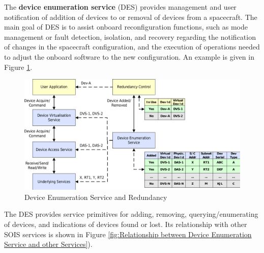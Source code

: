 The \textbf{device enumeration service} (DES) provides management and user notification of addition of devices to or removal of devices from a spacecraft. The main goal of DES is to assist onboard reconfiguration functions, such as mode management or fault detection, isolation, and recovery regarding the notification of changes in the spacecraft configuration, and the execution of operations needed to adjust the onboard software to the new configuration. An example is given in Figure \ref{fig:Device Enumeration Service and Redundancy}.

\begin{figure}[h]
\centering\includegraphics[scale=0.3]{fig/device_enumeration_service_and_redundancy}
\caption{Device Enumeration Service and Redundancy}
\label{fig:Device Enumeration Service and Redundancy}
\end{figure}

The DES provides service primitives for adding, removing, querying/enumerating of devices, and indications of devices found or lost. Its relationship with other SOIS services is shown in Figure \ref{fig:Relationship between Device Enumeration Service and other Services}).

